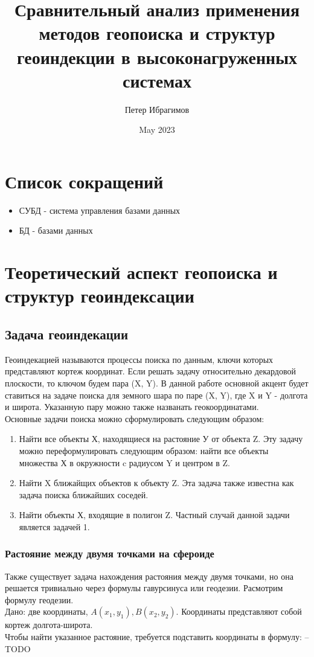 \documentclass{article}
\title{Сравнительный анализ применения методов геопоиска и структур геоиндекции в высоконагруженных системах}
\author{Петер Ибрагимов}
\date{May 2023}
\begin{document}
    \maketitle


    \section{Список сокращений}
    \begin{itemize}
        \item СУБД - система управления базами данных
        \item БД - базами данных

    \end{itemize}
    \section{Теоретический аспект геопоиска и структур геоиндексации}
    \subsection{Задача геоиндекации}

    Геоиндекацией называются процессы поиска по данным, ключи которых представляют кортеж координат. Если решать задачу относительно декардовой плоскости, то ключом будем пара (X, Y).  В данной работе основной акцент будет ставиться на задаче поиска для земного шара по паре (X, Y), где X и Y - долгота и широта. Указанную пару можно также названать геокоординатами.\\

    Основные задачи поиска можно сформулировать следующим образом:
    \begin{enumerate}
        \item Найти все объекты Х, находящиеся на растояние У от объекта Z. Эту задачу можно переформулировать следующим образом: найти все объекты множества Х в окружности c радиусом Y и центром в Z.
        \item Найти X ближайщих объектов к объекту Z. Эта задача также известна как задача поиска ближайших соседей.
        \item Найти объекты Х, входящие в полигон Z. Частный случай данной задачи является задачей 1.
    \end{enumerate}
    \subsubsection{Растояние между двумя точками на сфероиде}
    Также существует задача нахождения растояния между двумя точками, но она решается тривиально через формулы гавурсинуса или геодезии. Расмотрим формулу геодезии. \\
    Дано: две координаты, $A(x_1, y_1), B(x_2, y_2)$. Координаты представляют собой кортеж долгота-широта. \\
    Чтобы найти указанное растояние, требуется подставить координаты в формулу:
    -- TODO
\end{document}
